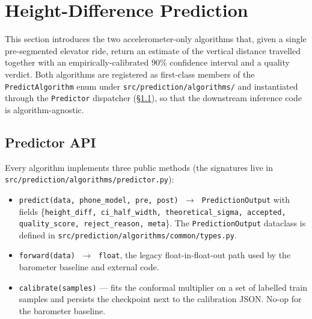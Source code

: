 
\section{Height-Difference Prediction}
\label{sec:height-prediction}

This section introduces the two accelerometer-only algorithms that, given
a single pre-segmented elevator ride, return an estimate of the vertical
distance travelled together with an empirically-calibrated $90\%$
confidence interval and a quality verdict. Both algorithms are
registered as first-class members of the \texttt{PredictAlgorithm} enum
under \texttt{src/prediction/algorithms/} and instantiated through the
\texttt{Predictor} dispatcher (\S\ref{sec:predictor-api}), so that the
downstream inference code is algorithm-agnostic.

\subsection{Predictor API}
\label{sec:predictor-api}

Every algorithm implements three public methods (the signatures live in
\texttt{\small src/prediction/\allowbreak{}algorithms/\allowbreak{}predictor.py}):

\begin{itemize}
  \item \texttt{predict(data, phone\_model, pre, post)} $\;\to\;$
        \texttt{PredictionOutput} with fields
        \{\texttt{height\_diff, ci\_half\_width, theoretical\_sigma,
        accepted, quality\_score, reject\_reason, meta}\}. The
        \texttt{PredictionOutput} dataclass is defined in
        \texttt{\small src/prediction/\allowbreak{}algorithms/\allowbreak{}common/\allowbreak{}types.py}.
  \item \texttt{forward(data)} $\;\to\;$ \texttt{float}, the legacy
        float-in-float-out path used by the barometer baseline and
        external code.
  \item \texttt{calibrate(samples)} — fits the conformal multiplier on
        a set of labelled train samples and persists the checkpoint
        next to the calibration JSON. No-op for the barometer
        baseline.
\end{itemize}

